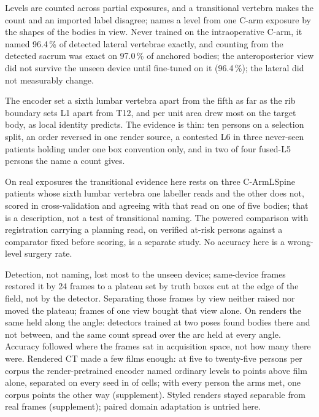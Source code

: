 Levels are counted across partial exposures, and a transitional vertebra makes the count and an imported label
disagree; \netname{} names a level from one C-arm exposure by the shapes of the bodies in view. Never trained on the intraoperative C-arm, it named 96.4\,\% of
detected lateral vertebrae exactly, and counting from the detected sacrum was exact on 97.0\,\% of anchored
bodies; the anteroposterior view did not survive the unseen device until fine-tuned on it (96.4\,\%); the lateral
did not measurably change.

The encoder set a sixth lumbar vertebra apart from the fifth as far as the rib boundary sets L1 apart from T12,
and per unit area drew most on the target body, as local identity predicts. The evidence is thin: ten persons on a
selection split, an order reversed in one render source, a contested L6 in three never-seen patients holding
under one box convention only, and in two of four fused-L5 persons the name a count gives.

On real exposures the transitional evidence here rests on three C-ArmLSpine patients whose sixth lumbar vertebra
one labeller reads and the other does not, scored in cross-validation and agreeing with that read on one of five
bodies; that is a description, not a test of transitional naming. The powered comparison with registration carrying
a planning read, on verified at-risk persons against a comparator fixed before scoring, is a separate study. No
accuracy here is a wrong-level surgery rate.

Detection, not naming, lost most to the unseen device; same-device frames restored it by 24 frames to a plateau
set by truth boxes cut at the edge of the field, not by the detector. Separating those frames by view neither raised
nor moved the plateau; frames of one view bought that view alone. On renders the same held along the angle:
detectors trained at two poses found bodies there and not between, and the same count spread over the arc held at
every angle. Accuracy followed where the frames sat in acquisition space, not how
many there were. Rendered CT made a few films enough: at five to twenty-five persons per corpus the render-pretrained
encoder named ordinary levels  to  points above film alone, separated
on every seed in  of  cells; with every person the arms met, one
corpus  points the other way (supplement). Styled renders stayed separable from real frames (supplement); paired domain adaptation
\citep{zheng2018pda} is untried here.
